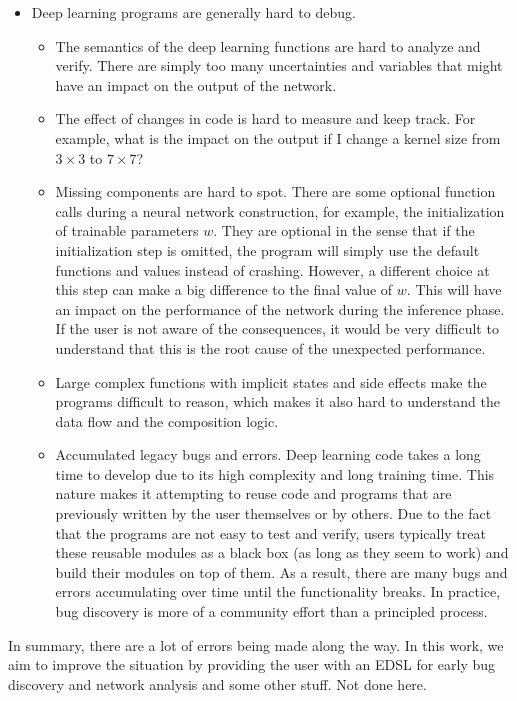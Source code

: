 \begin{itemize}
\begin{itemize}
\item Deep learning programs are generally hard to debug.
  \begin{itemize}
  \item The semantics of the deep learning functions are hard to analyze and verify. There are simply too many uncertainties and variables that might have an impact on the output of the network.
  \item The effect of changes in code is hard to measure and keep track. For example, what is the impact on the output if I change a kernel size from $3\times 3$ to $7\times 7$?
  \item Missing components are hard to spot. There are some optional function calls during a neural network construction, for example, the initialization of trainable parameters $w$.
    They are optional in the sense that if the initialization step is omitted, the program will simply use the default functions and values instead of crashing.
    However, a different choice at this step can make a big difference to the final value of $w$. This will have an impact on the performance of the network during the inference phase. If the user is not aware of the consequences, it would be very difficult to understand that this is the root cause of the unexpected performance.
\item Large complex functions with implicit states and side effects make the programs difficult to reason, which makes it also hard to understand the data flow and the composition logic.
    \item Accumulated legacy bugs and errors. Deep learning code takes a long time to develop due to its high complexity and long training time. This nature makes it attempting to reuse code and programs that are previously written by the user themselves or by others. Due to the fact that the programs are not easy to test and verify, users typically treat these reusable modules as a black box (as long as they seem to work) and build their modules on top of them. As a result, there are many bugs and errors accumulating over time until the functionality breaks. In practice, bug discovery is more of a community effort than a principled process.
  \end{itemize}
\end{itemize}
\end{itemize}
In summary, there are a lot of errors being made along the way. In this work, we aim to improve the situation by providing the user with an EDSL for early bug discovery and network analysis and some other stuff. Not done here.

